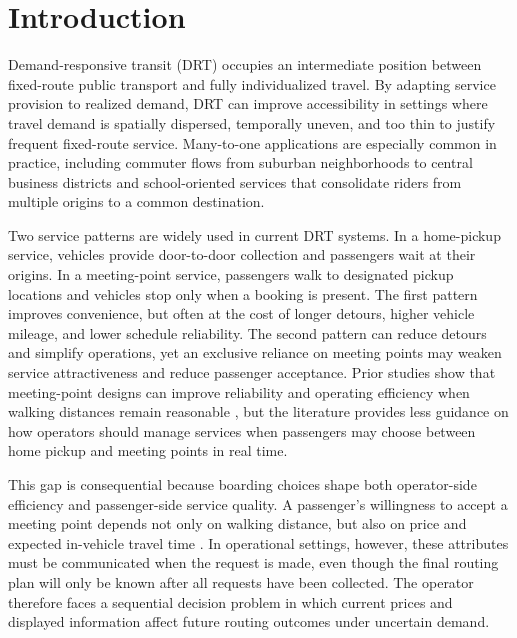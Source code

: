 \documentclass[preprint,12pt,authoryear]{elsarticle}
\begin{document}
\section{Introduction}
\label{sec:intro}

Demand-responsive transit (DRT) occupies an intermediate position between fixed-route public transport and fully individualized travel. By adapting service provision to realized demand, DRT can improve accessibility in settings where travel demand is spatially dispersed, temporally uneven, and too thin to justify frequent fixed-route service. Many-to-one applications are especially common in practice, including commuter flows from suburban neighborhoods to central business districts and school-oriented services that consolidate riders from multiple origins to a common destination.

Two service patterns are widely used in current DRT systems. In a home-pickup service, vehicles provide door-to-door collection and passengers wait at their origins. In a meeting-point service, passengers walk to designated pickup locations and vehicles stop only when a booking is present. The first pattern improves convenience, but often at the cost of longer detours, higher vehicle mileage, and lower schedule reliability. The second pattern can reduce detours and simplify operations, yet an exclusive reliance on meeting points may weaken service attractiveness and reduce passenger acceptance. Prior studies show that meeting-point designs can improve reliability and operating efficiency when walking distances remain reasonable \citep{zheng2019,zhang2023routing}, but the literature provides less guidance on how operators should manage services when passengers may choose between home pickup and meeting points in real time.

This gap is consequential because boarding choices shape both operator-side efficiency and passenger-side service quality. A passenger's willingness to accept a meeting point depends not only on walking distance, but also on price and expected in-vehicle travel time \citep{bai2019}. In operational settings, however, these attributes must be communicated when the request is made, even though the final routing plan will only be known after all requests have been collected. The operator therefore faces a sequential decision problem in which current prices and displayed information affect future routing outcomes under uncertain demand.
\end{document}
